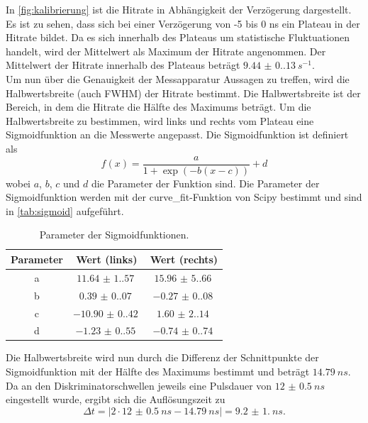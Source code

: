 In \autoref{fig:kalibrierung} ist die Hitrate in Abhängigkeit der Verzögerung dargestellt. Es ist zu sehen, dass sich bei einer Verzögerung von -5 bis 0 ns ein Plateau in der Hitrate bildet. Da es sich innerhalb
des Plateaus um statistische Fluktuationen handelt, wird der Mittelwert als Maximum der Hitrate angenommen. Der Mittelwert der Hitrate innerhalb des Plateaus beträgt $\SI{9.44(0.13)}{s^{-1}}$.\\
Um nun über die Genauigkeit der Messapparatur Aussagen zu treffen, wird die Halbwertsbreite (auch FWHM) der Hitrate bestimmt. Die Halbwertsbreite ist der Bereich, in dem die Hitrate die Hälfte des Maximums beträgt.
Um die Halbwertsbreite zu bestimmen, wird links und rechts vom Plateau eine Sigmoidfunktion an die Messwerte angepasst. Die Sigmoidfunktion ist definiert als
\begin{equation*}
  f(x) = \frac{a}{1 + \exp(-b(x-c))} + d
\end{equation*}
wobei $a$, $b$, $c$ und $d$ die Parameter der Funktion sind. Die Parameter der Sigmoidfunktion werden mit der curve\_fit-Funktion von Scipy \cite{scipy} bestimmt und sind in \autoref{tab:sigmoid} aufgeführt.

\begin{table}[H]
  \centering
  \caption{Parameter der Sigmoidfunktionen.}
  \label{tab:sigmoid}
  \begin{tabular}{c|c|c}
    \hline
    \textbf{Parameter} & \textbf{Wert (links)} & \textbf{Wert (rechts)}\\
    \hline
    a & $\SI{11.64(1.57)}{}$ & $\SI{15.96(5.66)}{}$\\
    b & $\SI{0.39(0.07)}{}$ & $\SI{-0.27(0.08)}{}$\\
    c & $\SI{-10.90(0.42)}{}$ & $\SI{1.60(2.14)}{}$\\
    d & $\SI{-1.23(0.55)}{}$ & $\SI{-0.74(0.74)}{}$\\
    \hline
  \end{tabular}
\end{table}

Die Halbwertsbreite wird nun durch die Differenz der Schnittpunkte der Sigmoidfunktion mit der Hälfte des Maximums bestimmt und beträgt $\SI{14.79}{ns}$. Da an den Diskriminatorschwellen jeweils eine Pulsdauer
von $\SI{12(0.5)}{ns}$ eingestellt wurde, ergibt sich die Auflösungszeit zu
\begin{equation*}
  \Delta t = |2 \cdot \SI{12(0.5)}{ns} - \SI{14.79}{ns}| = \SI{9.2(1.0)}{ns}.
\end{equation*}

